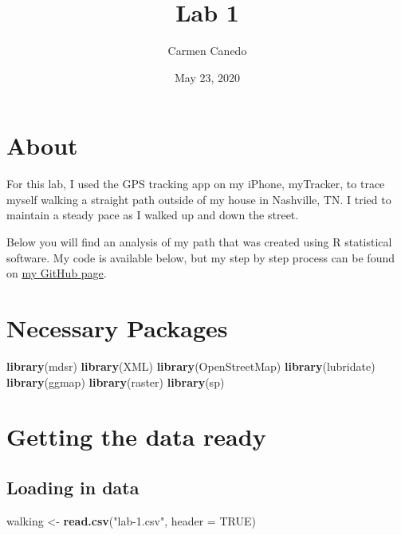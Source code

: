 \documentclass[
]{article}
\title{Lab 1}
\author{Carmen Canedo}
\date{May 23, 2020}
\newenvironment{Shaded}{\begin{snugshade}}{\end{snugshade}}
\newcommand{\DataTypeTok}[1]{\textcolor[rgb]{0.13,0.29,0.53}{#1}}
\newcommand{\KeywordTok}[1]{\textcolor[rgb]{0.13,0.29,0.53}{\textbf{#1}}}
\newcommand{\NormalTok}[1]{#1}
\newcommand{\OtherTok}[1]{\textcolor[rgb]{0.56,0.35,0.01}{#1}}
\newcommand{\StringTok}[1]{\textcolor[rgb]{0.31,0.60,0.02}{#1}}
\begin{document}
\maketitle

\hypertarget{about}{%
\section{About}\label{about}}

For this lab, I used the GPS tracking app on my iPhone, myTracker, to
trace myself walking a straight path outside of my house in Nashville,
TN. I tried to maintain a steady pace as I walked up and down the
street.

Below you will find an analysis of my path that was created using R
statistical software. My code is available below, but my step by step
process can be found on
\href{https://github.com/carmen-canedo/stat-202-lab1}{my GitHub page}.

\hypertarget{necessary-packages}{%
\section{Necessary Packages}\label{necessary-packages}}

\begin{Shaded}
\begin{Highlighting}[]
\KeywordTok{library}\NormalTok{(mdsr)}
\KeywordTok{library}\NormalTok{(XML)}
\KeywordTok{library}\NormalTok{(OpenStreetMap)}
\KeywordTok{library}\NormalTok{(lubridate)}
\KeywordTok{library}\NormalTok{(ggmap)}
\KeywordTok{library}\NormalTok{(raster)}
\KeywordTok{library}\NormalTok{(sp)}
\end{Highlighting}
\end{Shaded}

\hypertarget{getting-the-data-ready}{%
\section{Getting the data ready}\label{getting-the-data-ready}}

\hypertarget{loading-in-data}{%
\subsection{Loading in data}\label{loading-in-data}}

\begin{Shaded}
\begin{Highlighting}[]
\NormalTok{walking <-}\StringTok{ }\KeywordTok{read.csv}\NormalTok{(}\StringTok{"lab-1.csv"}\NormalTok{, }\DataTypeTok{header =} \OtherTok{TRUE}\NormalTok{)}
\end{Highlighting}
\end{Shaded}
\end{document}

